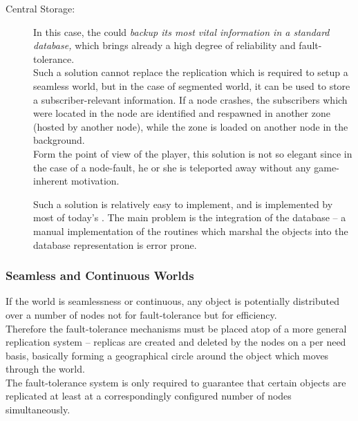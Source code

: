 \documentclass[a4paper, 10pt]{book}
\begin{document}
\begin{description}
                \item[Central Storage:] In this case, the \MMORG could \emph{backup
                    its most vital information in a standard database,} which brings
                    already a high degree of reliability and fault-tolerance.\\
                    Such a solution cannot replace the replication which is required to
                    setup a seamless world, but in the case of segmented world, it can
                    be used to store a subscriber-relevant information. If a node
                    crashes, the subscribers which were located in the node are
                    identified and respawned in another zone (hosted by another node),
                    while the zone is loaded on another node in the background.\\
                    Form the point of view of the player, this solution is not so
                    elegant since in the case of a node-fault, he or she is teleported
                    away without any game-inherent motivation.

                    Such a solution is relatively easy to implement, and is implemented
                    by most of today's \MMORGS. The main problem is the integration of
                    the database -- a manual implementation of the routines which
                    marshal the objects into the database representation is error
                    prone. 
            \end{description}


            \subsubsection{Seamless and Continuous Worlds}

            If the world is seamlessness or continuous, 
            any object is potentially distributed over a number of nodes not
            for fault-tolerance but for efficiency.\\

            Therefore the fault-tolerance mechanisms must be placed atop of a more
            general replication system -- replicas are created and deleted by the
            nodes on a per need basis, basically forming a geographical circle
            around the object which moves through the world.\\
            The fault-tolerance system is only required to guarantee that certain
            objects are replicated at least at a correspondingly configured number
            of nodes simultaneously.
\end{document}
